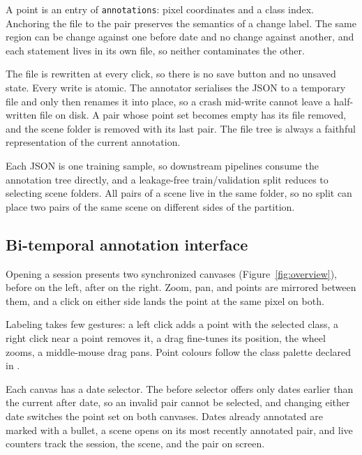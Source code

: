 A point is an entry of \texttt{annotations}: pixel coordinates and
a class index. Anchoring the file to the pair preserves the
semantics of a change label. The same region can be change against
one before date and no change against another, and each statement
lives in its own file, so neither contaminates the other.

The file is rewritten at every click, so there is no save button
and no unsaved state. Every write is atomic. The annotator
serialises the JSON to a temporary file and only then renames it
into place, so a crash mid-write cannot leave a half-written file
on disk. A pair whose
point set becomes empty has its file removed, and the scene folder
is removed with its last pair. The file tree is always a faithful
representation of the current annotation.

Each JSON is one training sample, so downstream pipelines consume
the annotation tree directly, and a leakage-free train/validation
split reduces to selecting scene folders. All pairs of a scene live
in the same folder, so no split can place two pairs of the same
scene on different sides of the partition.

\subsection{Bi-temporal annotation interface}
\label{sec:ui}

Opening a session presents two synchronized canvases
(Figure~\ref{fig:overview}), before on the left, after on the
right. Zoom, pan, and points are mirrored between them, and a click
on either side lands the point at the same pixel on both.

Labeling takes few gestures: a left click adds a point with the
selected class, a right click near a point removes it, a drag
fine-tunes its position, the wheel zooms, a middle-mouse drag pans.
Point colours follow the class palette declared in
.

Each canvas has a date selector. The before selector offers only
dates earlier than the current after date, so an invalid pair
cannot be selected, and changing either date switches the point set
on both canvases. Dates already annotated are marked with a bullet,
a scene opens on its most recently annotated pair, and live
counters track the session, the scene, and the pair on screen.

